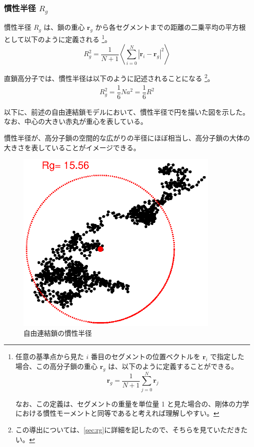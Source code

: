 \documentclass[11pt]{jsarticle}
\begin{document}
\subsubsection{慣性半径 $R_g$}

慣性半径 $R_g$ は、鎖の重心 $\bm{r}_g$ から各セグメントまでの距離の二乗平均の平方根として以下のように定義される
\footnote
{
任意の基準点から見た $i$ 番目のセグメントの位置ベクトルを $\bm{r}_i$ で指定した場合、この高分子鎖の重心 $\bm{r}_g$ は、以下のように定義することができる。
\begin{equation*}
\bm{r}_g = \dfrac{1}{N+1} \sum_{j=0}^{N} \bm{r}_j
\end{equation*}

なお、この定義は、セグメントの重量を単位量 1 と見た場合の、剛体の力学における慣性モーメントと同等であると考えれば理解しやすい。
}。
\begin{equation*}
R_g^2 = \dfrac{1}{N+1} \left\langle \sum_{i=0}^{N} |\bm{r}_i - \bm{r}_g|^2 \right\rangle
\end{equation*}

直鎖高分子では、慣性半径は以下のように記述されることになる
\footnote
{
この導出については、\ref{sec:rg}に詳細を記したので、そちらを見ていただきたい。
}。
\begin{align}
R_g^2 = \dfrac{1}{6}Na^2 = \dfrac{1}{6} R^2
\label{eq:rg_r}
\end{align}

以下に、前述の自由連結鎖モデルにおいて、慣性半径で円を描いた図を示した。
なお、中心の大きい赤丸が重心を表している。

慣性半径が、高分子鎖の空間的な広がりの半径にほぼ相当し、高分子鎖の大体の大きさを表していることがイメージできる。
\begin{figure}[htb]
 \centering
	\includegraphics[width=10cm]{figure/RF_Rg.eps}
	\caption{自由連結鎖の慣性半径}
	\label{fig: RF_Rg}
\end{figure}
\end{document}

